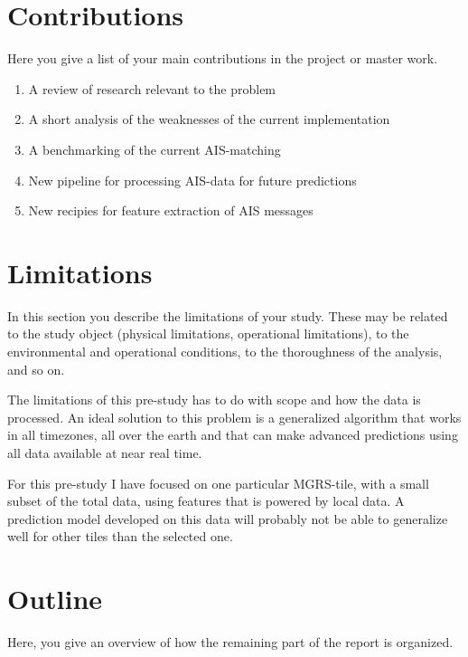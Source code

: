 \section{Contributions}
\label{sec:contributions}
\begin{info}
	Here you give a list of your main contributions in the project or master work.
\end{info}
\begin{enumerate}
	\item A review of research relevant to the problem
	\item A short analysis of the weaknesses of the current implementation
	\item A benchmarking of the current AIS-matching
	\item New pipeline for processing AIS-data for future predictions
	\item New recipies for feature extraction of AIS messages
\end{enumerate}

\section{Limitations}
\label{sec:limitations}
\begin{info}
	In this section you describe the limitations of your study. These may be related to the study object (physical limitations, operational limitations), to the environmental and operational conditions, to the thoroughness of the analysis, and so on.
\end{info}
The limitations of this pre-study has to do with scope and how the data is processed. An ideal solution to this problem is a generalized algorithm that works in all timezones, all over the earth and that can make advanced predictions using all data available at near real time. 

For this pre-study I have focused on one \cite{Tofting2018} particular MGRS-tile, with a small subset of the total data, using features that is powered by local data. A prediction model developed on this data will probably not be able to generalize well for other tiles than the selected one. 

\section{Outline}
\label{sec:outline}
\begin{info}
	Here, you give an overview of how the remaining part of the report is organized.
\end{info}


